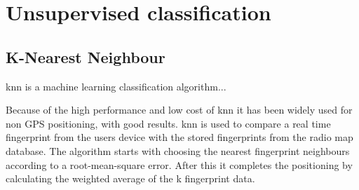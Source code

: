 \section{Unsupervised classification}\label{sec:theoryUnClass}

\subsection{K-Nearest Neighbour}\label{sec:theoryUnClassKnn}
\acrfull{knn} is a machine learning classification algorithm...

\bigskip

Because of the high performance and low cost of \acrshort{knn} it has been
widely used for non GPS positioning, with good results.  \acrshort{knn} is used
to compare a real time fingerprint from the users device with the stored
fingerprints from the radio map database.  The algorithm starts with choosing
the nearest fingerprint neighbours according to a root-mean-square error.  After
this it completes the positioning by calculating the weighted average of the k
fingerprint data.  \cite{IndoorFingerprintPositioning2017}  

